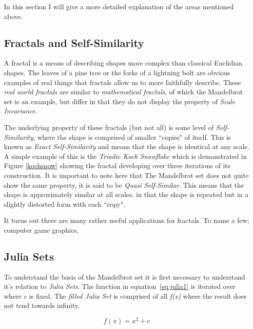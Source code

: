 In this section I will give a more detailed explanation of the areas mentioned above. 

\subsection{Fractals and Self-Similarity} 
A fractal is a means of describing shapes more complex than classical Euclidian shapes. The leaves of a pine tree or the forks of a lightning bolt are obvious
examples of real things that fractals allow us to more faithfully describe. These \textit{real world fractals} are similar to \textit{mathematical fractals}, 
of which the Mandelbrot set is an example, but differ in that they do not display the property of \textit{Scale Invariance}. 

The underlying property of these fractals (but not all) is some level of \textit{Self-Similarity}, where the shape is comprised of smaller ``copies" of itself. 
This is known as \textit{Exact Self-Similarity} and means that the shape is identical at any scale.
A simple example of this is the \textit{Triadic Koch Snowflake} which is demonstrated in Figure \ref{kochsnow} showing the fractal developing 
over three iterations of its construction. It is important to note here that The Mandelbrot set does not quite show the same property, it is said to be 
\textit{Quasi Self-Similar}. This means that the shape is approximately similar at all scales, in that the shape is repeated but in a slightly distorted
form with each ``copy".

It turns out there are many rather useful applications for fractals. To name a few; computer game graphics, %

\subsection{Julia Sets}
To understand the basis of the Mandelbrot set it is first necessary to understand it's relation to \textit{Julia Sets}.
The function in equation~\ref{eq:julia1} is iterated over where \textit{c} is fixed.
The \textit{filled Julia Set} is comprised of all \textit{f(x)} where the result does not tend towards infinity.

\begin{equation}\label{eq:julia1}
f(x) = x^2 + c
\end{equation}


